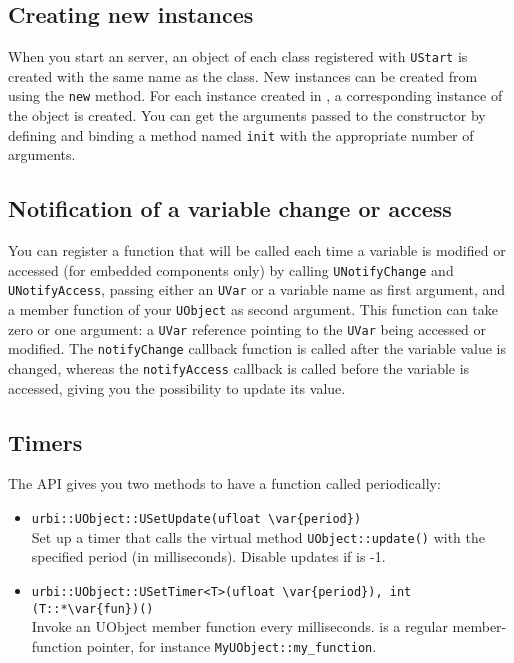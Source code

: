 \subsection{Creating new instances}

When you start an \urbi server, an object of each class registered
with \lstinline{UStart} is created with the same name as the
class. New instances can be created from \urbi using the
\lstinline|new| method. For each instance created in \urbi, a
corresponding instance of the \Cxx object is created. You can get the
arguments passed to the constructor by defining and binding a method
named \lstinline|init| with the appropriate number of arguments.

\subsection{Notification of a variable change or access}

You can register a function that will be called each time a variable
is modified or accessed (for embedded components only) by calling
\lstinline{UNotifyChange} and \lstinline{UNotifyAccess}, passing
either an \lstinline{UVar} or a variable name as first argument, and a
member function of your \lstinline{UObject} as second argument. This
function can take zero or one argument: a \lstinline{UVar} reference
pointing to the \lstinline{UVar} being accessed or modified. The
\lstinline{notifyChange} callback function is called after the
variable value is changed, whereas the \lstinline{notifyAccess}
callback is called before the variable is accessed, giving you the
possibility to update its value.

\subsection{Timers}
\label{sec:uob:timers}

The API gives you two methods to have a function called periodically:
\begin{itemize}
\item \lstinline|urbi::UObject::USetUpdate(ufloat \var{period})|\\
  Set up a timer that calls the virtual method
  \lstinline{UObject::update()} with the specified period (in
  milliseconds).  Disable updates if  is -1.

\item \lstinline|urbi::UObject::USetTimer<T>(ufloat \var{period}), int (T::*\var{fun})()|\\
  Invoke an UObject member function  every 
  milliseconds.   is a regular member-function pointer, for
  instance \lstinline|MyUObject::my_function|.
\end{itemize}

